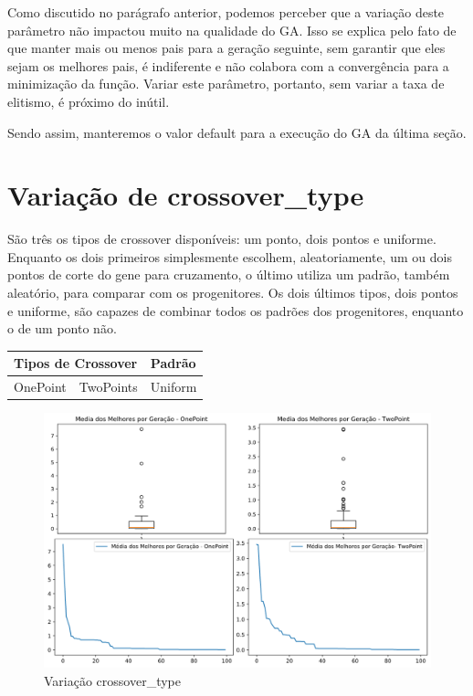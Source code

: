 \documentclass[12pt]{article}
\begin{document}
Como discutido no parágrafo anterior, podemos perceber que a variação deste parâmetro não impactou muito na qualidade do GA. Isso se explica pelo fato de que manter mais ou menos pais para a geração seguinte, sem garantir que eles sejam os melhores pais, é indiferente e não colabora com a convergência para a minimização da função. Variar este parâmetro, portanto, sem variar a taxa de elitismo, é próximo do inútil.

Sendo assim, manteremos o valor default para a execução do GA da última seção.

\section{Variação de crossover\_type}

São três os tipos de crossover disponíveis: um ponto, dois pontos e uniforme. Enquanto os dois primeiros simplesmente escolhem, aleatoriamente, um ou dois pontos de corte do gene para cruzamento, o último utiliza um padrão, também aleatório, para comparar com os progenitores. Os dois últimos tipos, dois pontos e uniforme, são capazes de combinar todos os padrões dos progenitores, enquanto o de um ponto não.

\begin{table}[H]
	\centering
	\begin{tabular}{|l|l|l|}
		\hline
		\multicolumn{2}{|l|}{Tipos de Crossover}&Padrão \\ \hline
		OnePoint    & TwoPoints    & Uniform    \\ \hline
	\end{tabular}
\end{table}

\begin{figure}[H]
	\centering
	\includegraphics[width=0.9\linewidth]{Imagens/TipoCross}
	\caption{Variação crossover\_type}
	\label{fig:tipocross}
\end{figure}
\end{document}
